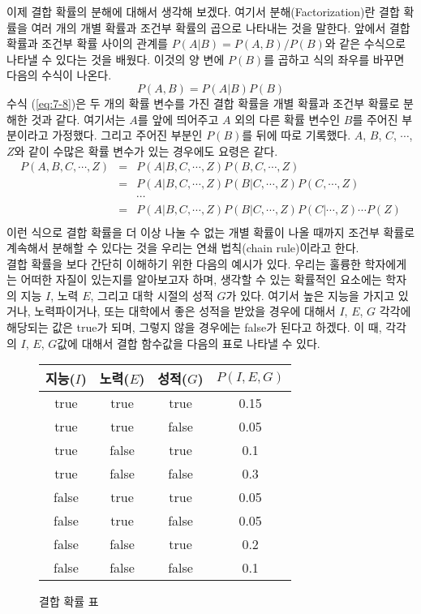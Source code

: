 \documentclass[a4paper]{oblivoir}
\begin{document}
이제 결합 확률의 분해에 대해서 생각해 보겠다. 여기서 분해(Factorization)란 결합 확률을 여러 개의 개별 확률과 조건부 확률의 곱으로 나타내는 것을 말한다. 앞에서 결합 확률과 조건부 확률 사이의 관계를 $P(A|B)=P(A,B)/P(B)$와 같은 수식으로 나타낼 수 있다는 것을 배웠다. 이것의 양 변에 $P(B)$를 곱하고 식의 좌우를 바꾸면 다음의 수식이 나온다. 
\begin{equation}
P(A,B) = P(A|B)P(B)
\label{eq:7-8}
\end{equation}
수식 (\ref{eq:7-8})은 두 개의 확률 변수를 가진 결합 확률을 개별 확률과 조건부 확률로 분해한 것과 같다. 여기서는 $A$를 앞에 띄어주고 $A$ 외의 다른 확률 변수인 $B$를 주어진 부분이라고 가정했다. 그리고 주어진 부분인 $P(B)$를 뒤에 따로 기록했다. $A$, $B$, $C$, $\cdots$, $Z$와 같이 수많은 확률 변수가 있는 경우에도 요령은 같다. 
\begin{eqnarray}
P(A, B, C, \cdots, Z) & = & P(A | B, C, \cdots, Z)P(B, C, \cdots, Z) \nonumber \\
& = & P(A | B, C, \cdots, Z) P(B | C, \cdots, Z) P(C, \cdots, Z) \nonumber \\
&  & \cdots \nonumber \\
& = & P(A | B, C, \cdots, Z) P(B | C, \cdots, Z) P(C | \cdots, Z) \cdots P(Z) \nonumber  \\
&  & \label{eq:7-9}
\end{eqnarray}
이런 식으로 결합 확률을 더 이상 나눌 수 없는 개별 확률이 나올 때까지 조건부 확률로 계속해서 분해할 수 있다는 것을 우리는 연쇄 법칙(chain rule)이라고 한다. \\

결합 확률을 보다 간단히 이해하기 위한 다음의 예시가 있다. 우리는 훌륭한 학자에게는 어떠한 자질이 있는지를 알아보고자 하며, 생각할 수 있는 확률적인 요소에는 학자의 지능 $I$, 노력 $E$, 그리고 대학 시절의 성적 $G$가 있다. 여기서 높은 지능을 가지고 있거나, 노력파이거나, 또는 대학에서 좋은 성적을 받았을 경우에 대해서 $I$, $E$, $G$ 각각에 해당되는 값은 true가 되며, 그렇지 않을 경우에는 false가 된다고 하겠다. 이 때, 각각의 $I$, $E$, $G$값에 대해서 결합 함수값을 다음의 표로 나타낼 수 있다. \\

\begin{figure}[ht] \centering 
\begin{tabular}{|c|c|c|c|}
  \hline
  지능($I$) & 노력($E$) & 성적($G$) & $P(I,E,G)$ \\
  \hline
  true & true & true & 0.15 \\
  \hline
  true & true & false & 0.05 \\
  \hline
  true & false & true & 0.1 \\
  \hline
  true & false & false & 0.3 \\
  \hline
  false & true & true & 0.05 \\
  \hline
  false & true & false & 0.05 \\
  \hline
  false & false & true & 0.2 \\
  \hline
  false & false & false & 0.1 \\ 
  \hline
\end{tabular}
\caption{결합 확률 표}
\label{fig:7-3}
\end{figure} 
\end{document}

